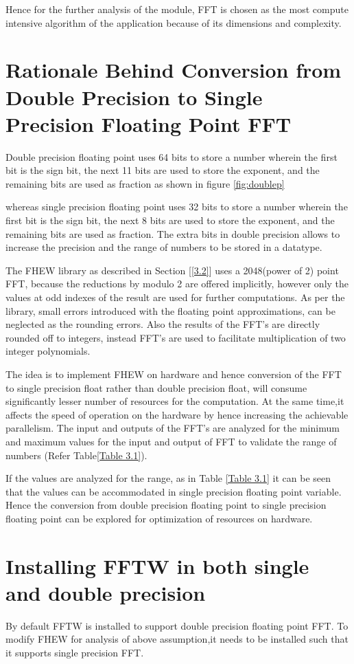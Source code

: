 Hence for the further analysis of the module, FFT is chosen as the most compute intensive algorithm of the application because of its dimensions and complexity.
\section{Rationale Behind Conversion from Double Precision to Single Precision Floating Point FFT}
Double precision floating point uses 64 bits to store a number wherein the first bit is the sign bit, the next 11 bits are used to store the exponent, and the remaining bits are used as fraction as shown in figure \ref{fig:doublep} 


\noindent whereas single precision floating point uses 32 bits to store a number wherein the first bit is the sign bit, the next 8 bits are used to store the exponent, and the remaining bits are used as fraction. The extra bits in double precision allows to increase the precision and the range of numbers to be stored in a datatype. 

\noindent The FHEW library as described in Section [{\ref{3.2}}] uses a 2048(power of 2) point FFT, because the reductions by modulo 2 are offered implicitly, however only the values at odd indexes of the result are used for further computations. As per the library, small errors introduced with the floating point approximations, can be neglected as the rounding errors. Also the results of the FFT's are directly rounded off to integers, instead FFT's are used to facilitate multiplication of two integer polynomials. 

\noindent The idea is to implement FHEW on hardware and hence conversion of the FFT to single precision float rather than double precision float, will consume significantly lesser number of resources for the computation. At the same time,it affects the speed of operation on the hardware by hence increasing the achievable parallelism. The input and outputs of the FFT's are analyzed for the minimum and maximum values for the input and output of FFT to validate the range of numbers (Refer Table\ref{Table 3.1}).


If the values are analyzed for the range, as in Table \ref{Table 3.1} it can be seen that the values can be accommodated in single precision floating point variable. Hence the conversion from double precision floating point to single precision floating point can be explored for optimization of resources on hardware. 
\section{Installing FFTW in both single and double precision}
By default FFTW is installed to support double precision floating point FFT. To modify FHEW for analysis of above assumption,it needs to be installed such that it supports single precision FFT.

